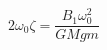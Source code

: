 \begin{equation} \label{eq:zeta_B1_equation}
2 \omega_{0} \zeta = \frac{B_{1} \omega_{0}^{2}}{GM g m}
\end{equation}

